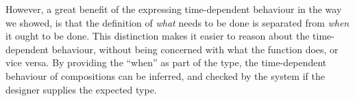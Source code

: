 However, a great benefit of the expressing time-dependent behaviour in the way we showed, is that the definition of \textit{what} needs to be done is separated from \textit{when} it ought to be done.
This distinction makes it easier to reason about the time-dependent behaviour, without being concerned with what the function does, or vice versa.
By providing the ``when'' as part of the type, the time-dependent behaviour of compositions can be inferred, and checked by the system if the designer supplies the expected type.

%
